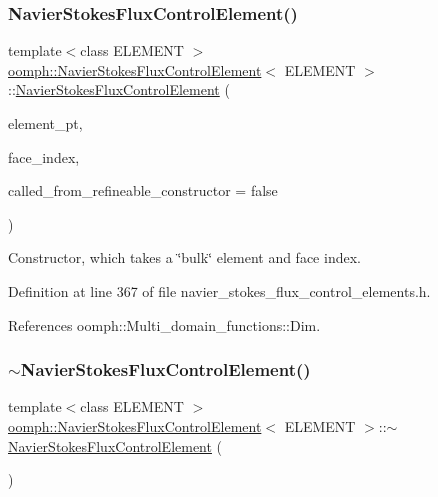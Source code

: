 \subsubsection{\texorpdfstring{Navier\+Stokes\+Flux\+Control\+Element()}{NavierStokesFluxControlElement()}}
{\footnotesize\ttfamily template$<$class E\+L\+E\+M\+E\+NT $>$ \\
\hyperlink{classoomph_1_1NavierStokesFluxControlElement}{oomph\+::\+Navier\+Stokes\+Flux\+Control\+Element}$<$ E\+L\+E\+M\+E\+NT $>$\+::\hyperlink{classoomph_1_1NavierStokesFluxControlElement}{Navier\+Stokes\+Flux\+Control\+Element} (\begin{DoxyParamCaption}\item[{\hyperlink{classoomph_1_1FiniteElement}{Finite\+Element} $\ast$const \&}]{element\+\_\+pt,  }\item[{const int \&}]{face\+\_\+index,  }\item[{const bool \&}]{called\+\_\+from\+\_\+refineable\+\_\+constructor = {\ttfamily false} }\end{DoxyParamCaption})\hspace{0.3cm}{\ttfamily [inline]}}



Constructor, which takes a \char`\"{}bulk\char`\"{} element and face index. 



Definition at line 367 of file navier\+\_\+stokes\+\_\+flux\+\_\+control\+\_\+elements.\+h.



References oomph\+::\+Multi\+\_\+domain\+\_\+functions\+::\+Dim.

\mbox{\label{classoomph_1_1NavierStokesFluxControlElement_a5d2ae1598fc1a68be1abf01b20e54529}} 
\subsubsection{\texorpdfstring{$\sim$\+Navier\+Stokes\+Flux\+Control\+Element()}{~NavierStokesFluxControlElement()}}
{\footnotesize\ttfamily template$<$class E\+L\+E\+M\+E\+NT $>$ \\
\hyperlink{classoomph_1_1NavierStokesFluxControlElement}{oomph\+::\+Navier\+Stokes\+Flux\+Control\+Element}$<$ E\+L\+E\+M\+E\+NT $>$\+::$\sim$\hyperlink{classoomph_1_1NavierStokesFluxControlElement}{Navier\+Stokes\+Flux\+Control\+Element} (\begin{DoxyParamCaption}{ }\end{DoxyParamCaption})\hspace{0.3cm}{\ttfamily [inline]}}



